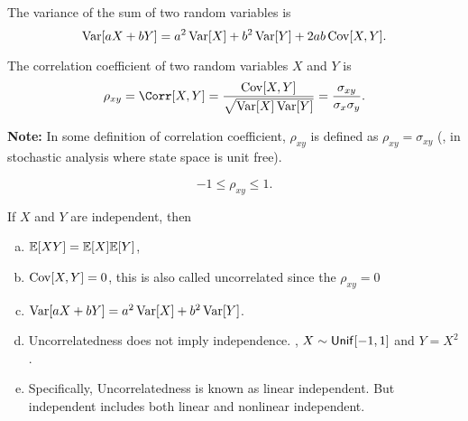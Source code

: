 \begin{theorem}
    The variance of the sum of two random variables is
    \[\mathop{\mathrm{Var}}\nolimits[aX+bY]=a^2\mathop{\mathrm{Var}}\nolimits[X]+b^2\mathop{\mathrm{Var}}\nolimits[Y]+2ab\mathop{\mathrm{Cov}}\nolimits[X,Y].\]
\end{theorem}

\begin{definition}
    The correlation coefficient of two random variables $X$ and $Y$ is
    \[\rho_{xy}=\Corr[X,Y]=\frac{\Cov[X,Y]}{\sqrt{\Var[X]\Var[Y]}}=\frac{\sigma_{xy}}{\sigma_x\sigma_y}.\]
\end{definition}
\textbf{Note:} In some definition of correlation coefficient, $\rho_{xy}$ is defined as $\rho_{xy}=\sigma_{xy}$ (\eg, in stochastic analysis where state space is unit free).

\begin{theorem}
    \[-1\leq \rho_{xy}\leq 1.\]
\end{theorem}

\begin{theorem}
    If $X$ and $Y$ are independent, then
    \begin{enumerate}[(a)]
        \item $\E{XY}=\E{X}\E{Y}$,
        \item $\mathop{\mathrm{Cov}}\nolimits[X, Y]=0$, this is also called uncorrelated since the $\rho_{xy}=0$
        \item $\mathop{\mathrm{Var}}\nolimits[aX+bY]=a^2\mathop{\mathrm{Var}}\nolimits[X]+b^2\mathop{\mathrm{Var}}\nolimits[Y]$.
        \item Uncorrelatedness  does not imply independence. \eg, $X\sim \mathsf{Unif}[-1,1]$ and $Y=X^2$.
        \item Specifically, Uncorrelatedness is known as linear independent. But independent includes both linear and nonlinear independent.
    \end{enumerate}
\end{theorem}



